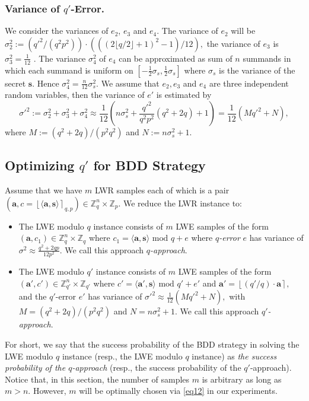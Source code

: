 \documentclass[runningheads]{llncs}
\begin{document}
\subsubsection {Variance of $q'$-Error.}
We consider the variances of $e_2$, $e_3$ and $e_4$. The variance of $e_2$ will be
$\sigma_2^2:=\left({q'^2}/{(q^2p^2)}\right)\cdot \left(\left(\left(2\lfloor q/2 \rfloor+1 \right)^2-1\right)/{12}\right),$
the variance of $e_3$ is $\sigma_3^2=\frac{1}{12}$ . The variance $\sigma^2_4$ of $e_4$ can be approximated as sum of $n$ summands in which each summand is uniform on $[-\frac{1}{2}\sigma_s,\frac{1}{2}\sigma_s]$ where $\sigma_s$ is the variance of the secret $\mathbf{s}$. Hence  $\sigma^2_4=\frac{n}{12}\sigma^2_s.$
We assume that $e_2, e_3$ and $e_4$ are three independent random variables, then the variance of $e'$ is estimated by
\begin{equation}\label{eq13}
\sigma'^2 := \sigma_2^2+\sigma_3^2+\sigma_4^2\approx \frac{1}{12} \left(n\sigma^2_s+\frac{q'^2}{q^2p^2}\left(q^2+2q \right)+1 \right)=\frac{1}{12} \left(Mq'^2+N \right),
\end{equation}
where   $M:=(q^2+2q)/(p^2q^2)$ and $N:=n\sigma_s^2+1.$
\subsection {Optimizing $q'$ for BDD Strategy}

Assume that we have $m$ LWR samples each of which is a pair 
$(\mathbf{a}, c=\left\lfloor \langle \mathbf{a},\mathbf{s} \rangle \right\rceil_{q,p}) \in \mathbb{Z}_q^{n} \times \mathbb{Z}_p$. We reduce the LWR instance to:

\begin{itemize}
	\item The LWE modulo $q$  instance consists of $m$ LWE samples of the form $(\mathbf{a},c_1) \in \mathbb{Z}_q^{n} \times \mathbb{Z}_q$ where
$c_1 =\langle \mathbf{a}, \mathbf{s} \rangle \text{ mod } q+e$
where \textit{$q$-error} $e$ has variance of $ \sigma^2 \approx \frac{q^2+2qp}{12p^2}.$
We call this approach \textit{$q$-approach}.
 \item The LWE modulo $q'$ instance consists of $m$ LWE samples of the form $(\mathbf{a}',c') \in \mathbb{Z}_{q'}^{n} \times \mathbb{Z}_{q'}$
 where $c'=\langle \mathbf{a}',\mathbf{s} \rangle \text{ mod } q'+e'$ and $\mathbf{a}'=\left\lfloor ({q'}/{q}) \cdot \mathbf{a} \right\rceil,$ and the $q'$-error $e'$ has variance of  
 $
 \sigma'^2 \approx \frac{1}{12} \left(Mq'^2+N \right),
 $ with $M=(q^2+2q)/(p^2q^2)$ and $N=n\sigma_s^2+1.$
 We call this approach \textit{$q'$-approach}.
\end{itemize} 
For short, we say that the success probability of the BDD strategy in solving the LWE modulo $q$ instance (resp., the LWE modulo $q$ instance) as \textit{the success probability of the $q$-approach} (resp., the success probability of the $q'$-approach).
Notice that, in this section, the number of samples $m$ is arbitrary as long as $m > n$. However, $m$ will be optimally chosen via \eqref{eq12} in our experiments.
\end{document}
